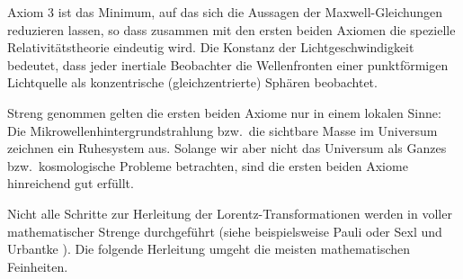 Axiom 3 ist das Minimum, auf das sich die Aussagen der Maxwell-Gleichungen
reduzieren lassen, so dass zusammen mit den ersten
beiden Axiomen die 
spezielle Relativit\"atstheorie eindeutig wird. Die Konstanz der
Lichtgeschwindigkeit bedeutet, dass jeder inertiale Beobachter
die Wellenfronten einer punktf\"ormigen Lichtquelle als 
konzentrische (gleichzentrierte) Sph\"aren beobachtet. 

Streng genommen gelten die ersten beiden
Axiome nur in einem lokalen Sinne: Die Mikrowellenhintergrundstrahlung
bzw.\ die sichtbare Masse im Universum zeichnen
ein Ruhesystem aus. Solange wir aber nicht
das Universum als Ganzes bzw.\ kosmologische
Probleme betrachten, sind die ersten beiden
Axiome hinreichend gut erf\"ullt.

Nicht alle Schritte zur Herleitung der
Lorentz-Transformationen werden in voller
mathematischer Strenge durchgef\"uhrt (siehe
beispielsweise Pauli \cite{Pauli} 
oder Sexl und 
Urbantke \cite{Sexl}). Die folgende Herleitung
umgeht die meisten mathematischen
Feinheiten.

